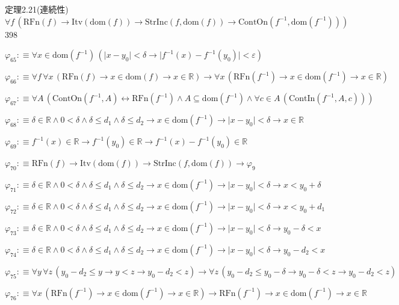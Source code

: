 \begin{fullproof}{定理2.21(連続性)}{$\forall f\,(\mathrm{RFn}(f) \to \mathrm{Itv}(\mathrm{dom}(f)) \to \mathrm{StrInc}(f,\mathrm{dom}(f)) \to \mathrm{ContOn}(f^{-1},\mathrm{dom}(f^{-1})))$}{398}
\begin{abbrevlist}
\item $\varphi_{65} :\equiv \forall x \in \mathrm{dom}(f^{-1})\,(\lvert x - y_{0} \rvert < \delta \to \lvert f^{-1}(x) - f^{-1}(y_{0}) \rvert < \varepsilon)$
\item $\varphi_{66} :\equiv \forall f\,\forall x\,(\mathrm{RFn}(f) \to x \in \mathrm{dom}(f) \to x \in \mathbb{R}) \to \forall x\,(\mathrm{RFn}(f^{-1}) \to x \in \mathrm{dom}(f^{-1}) \to x \in \mathbb{R})$
\item $\varphi_{67} :\equiv \forall A\,(\mathrm{ContOn}(f^{-1},A) \leftrightarrow \mathrm{RFn}(f^{-1}) \land A \subseteq \mathrm{dom}(f^{-1}) \land \forall c \in A\,(\mathrm{ContIn}(f^{-1},A,c)))$
\item $\varphi_{68} :\equiv \delta \in \mathbb{R} \land 0 < \delta \land \delta \leq d_{1} \land \delta \leq d_{2} \to x \in \mathrm{dom}(f^{-1}) \to \lvert x - y_{0} \rvert < \delta \to x \in \mathbb{R}$
\item $\varphi_{69} :\equiv f^{-1}(x) \in \mathbb{R} \to f^{-1}(y_{0}) \in \mathbb{R} \to f^{-1}(x) - f^{-1}(y_{0}) \in \mathbb{R}$
\item $\varphi_{70} :\equiv \mathrm{RFn}(f) \to \mathrm{Itv}(\mathrm{dom}(f)) \to \mathrm{StrInc}(f,\mathrm{dom}(f)) \to \varphi_{9}$
\item $\varphi_{71} :\equiv \delta \in \mathbb{R} \land 0 < \delta \land \delta \leq d_{1} \land \delta \leq d_{2} \to x \in \mathrm{dom}(f^{-1}) \to \lvert x - y_{0} \rvert < \delta \to x < y_{0} + \delta$
\item $\varphi_{72} :\equiv \delta \in \mathbb{R} \land 0 < \delta \land \delta \leq d_{1} \land \delta \leq d_{2} \to x \in \mathrm{dom}(f^{-1}) \to \lvert x - y_{0} \rvert < \delta \to x < y_{0} + d_{1}$
\item $\varphi_{73} :\equiv \delta \in \mathbb{R} \land 0 < \delta \land \delta \leq d_{1} \land \delta \leq d_{2} \to x \in \mathrm{dom}(f^{-1}) \to \lvert x - y_{0} \rvert < \delta \to y_{0} - \delta < x$
\item $\varphi_{74} :\equiv \delta \in \mathbb{R} \land 0 < \delta \land \delta \leq d_{1} \land \delta \leq d_{2} \to x \in \mathrm{dom}(f^{-1}) \to \lvert x - y_{0} \rvert < \delta \to y_{0} - d_{2} < x$
\item $\varphi_{75} :\equiv \forall y\,\forall z\,(y_{0} - d_{2} \leq y \to y < z \to y_{0} - d_{2} < z) \to \forall z\,(y_{0} - d_{2} \leq y_{0} - \delta \to y_{0} - \delta < z \to y_{0} - d_{2} < z)$
\item $\varphi_{76} :\equiv \forall x\,(\mathrm{RFn}(f^{-1}) \to x \in \mathrm{dom}(f^{-1}) \to x \in \mathbb{R}) \to \mathrm{RFn}(f^{-1}) \to x \in \mathrm{dom}(f^{-1}) \to x \in \mathbb{R}$

\end{abbrevlist}
\end{fullproof}
